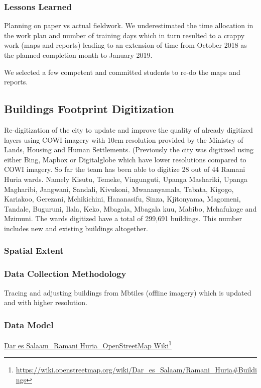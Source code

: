 \documentclass[a4paper,12pt,twoside]{article}
\begin{document}
\subsubsection{Lessons Learned}
Planning on paper vs actual fieldwork. We underestimated the time allocation in the work plan and number of training days which in turn resulted to a crappy work (maps and reports) leading to an  extension of time from October 2018 as the planned completion month to January 2019.

\medskip
We selected a few competent and committed students to re-do the maps and reports.


\newpage
\subsection{Buildings Footprint Digitization}
\begin{multicols}{2}
Re-digitization of the city to update and improve the quality of already digitized layers using COWI imagery with 10cm resolution provided by the Ministry of Lands, Housing and Human Settlements. (Previously the city was digitized using either Bing, Mapbox or Digitalglobe which have lower resolutions compared to COWI imagery. So far the team has been able to digitize 28 out of 44 Ramani Huria wards. Namely Kisutu, Temeke, Vingunguti, Upanga Mashariki, Upanga Magharibi, Jangwani, Sandali, Kivukoni, Mwananyamala, Tabata, Kigogo, Kariakoo, Gerezani, Mchikichini, Hananasifu, Sinza, Kjitonyama, Magomeni, Tandale, Buguruni, Ilala, Keko, Mbagala, Mbagala kuu, Mabibo, Mchafukoge and Mzimuni. The wards digitized have a total of 299,691 buildings. This number includes new and existing buildings altogether.
\end{multicols}

\subsubsection{Spatial Extent}

\subsubsection{Data Collection Methodology}

Tracing and adjusting buildings from Mbtiles (offline imagery) which is updated and with higher resolution.

\subsubsection{Data Model}
\href{https://wiki.openstreetmap.org/wiki/Dar_es_Salaam/Ramani_Huria\#Buildings}{Dar es Salaam\_Ramani Huria\_OpenStreetMap Wiki}\footnote{\url{https://wiki.openstreetmap.org/wiki/Dar_es_Salaam/Ramani_Huria#Buildings}}
\end{document}
